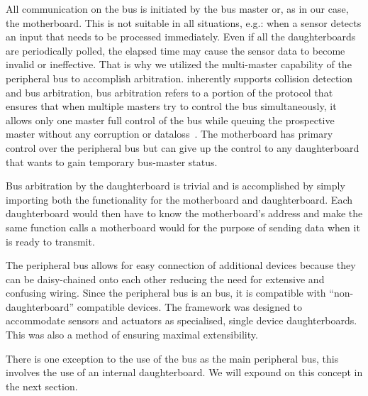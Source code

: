 	All communication on the \iic bus is initiated by the bus master or, as in our case, the motherboard. This is not suitable in all situations, e.g.: when a sensor detects an input that needs to be processed immediately. Even if all the daughterboards are periodically polled, the elapsed time may cause the sensor data to become invalid or ineffective. That is why we utilized the multi-master capability of the \iic peripheral bus to accomplish arbitration. \iic inherently supports collision detection and bus arbitration, bus arbitration refers to a portion of the protocol that ensures that when multiple masters try to control the bus simultaneously, it allows only one master full control of the bus while queuing the prospective master without any corruption or dataloss~\parencite{nxpi2c}. The motherboard has primary control over the peripheral bus but can give up the control to any daughterboard that wants to gain temporary bus-master status. 

	Bus arbitration by the daughterboard is trivial and is accomplished by simply importing both the functionality for the motherboard and daughterboard. Each daughterboard would then have to know the motherboard's \iic address and make the same function calls a motherboard would for the purpose of sending data when it is ready to transmit.
	
	The peripheral bus allows for easy connection of additional devices because they can be daisy-chained onto each other reducing the need for extensive and confusing wiring. Since the peripheral bus is an \iic bus, it is compatible with ``non-daughterboard'' \iic compatible devices. The framework was designed to accommodate sensors and actuators as specialised, single device daughterboards. This was also a method of ensuring maximal extensibility.
	
	There is one exception to the use of the \iic bus as the main peripheral bus, this involves the use of an internal daughterboard. We will expound on this concept in the next section.




	
